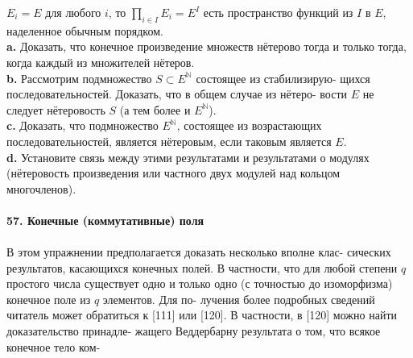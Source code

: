 \documentclass{mai_book}
\begin{document}
\noindent $E_i=E$ для любого $i$, то $\prod_{i\in I} E_i=E^I$ есть пространство функций из $I$\linebreak
в $E$, наделенное обычным порядком.\\
\hspace*{10pt}\textbf{a.} Доказать, что конечное произведение множеств нётерово тогда\linebreak
и только тогда, когда каждый из множителей нётеров.\\
\hspace*{10pt}\textbf{b.} Рассмотрим подмножество $S \subset E^\mathbb{N}$ состоящее из стабилизирую-\linebreak
щихся последовательностей. Доказать, что в общем случае из нётеро-\linebreak
вости $E$ не следует нётеровость $S$ (а тем более и $E^\mathbb{N}$).
\\
\hspace*{10pt}\textbf{c.} Доказать, что подмножество  $E^\mathbb{N}$, состоящее из возрастающих\linebreak
последовательностей, является нётеровым, если таковым является $E$.
\\
\hspace*{10pt}\textbf{d.} Установите связь между этими результатами и результатами\linebreak
о модулях (нётеровость произведения или частного двух модулей над\linebreak
кольцом многочленов).
\\
\\
\noindent\textbf{57. Конечные (коммутативные) поля}\\\\
\hspace*{10pt} В этом упражнении предполагается доказать несколько вполне клас-\linebreak
сических результатов, касающихся конечных полей. В частности, что\linebreak
для любой степени $q$ простого числа существует одно и только одно\linebreak
(с точностью до изоморфизма) конечное поле из $q$ элементов. Для по-\linebreak
лучения более подробных сведений читатель может обратиться к [111]\linebreak
или [120]. В частности, в [120] можно найти доказательство принадле-\linebreak
жащего Веддербарну результата о том, что всякое конечное тело ком-\linebreak
\end{document}
